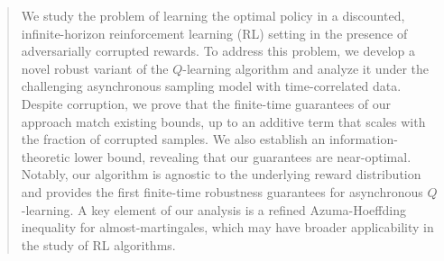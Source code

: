 \documentclass{article}
\begin{document}

\printAffiliationsAndNotice{}  %



\begin{abstract}
We study the problem of learning the optimal policy in a discounted, infinite-horizon reinforcement learning (RL) setting in the presence of adversarially corrupted rewards. To address this problem, we develop a novel robust variant of the \(Q\)-learning algorithm and analyze it under the challenging asynchronous sampling model with time-correlated data. Despite corruption, we prove that the finite-time guarantees of our approach match existing bounds, up to an additive term that scales with the fraction of corrupted samples. We also establish an information-theoretic lower bound, revealing that our guarantees are near-optimal. Notably, our algorithm is agnostic to the underlying reward distribution and provides the first finite-time robustness guarantees for asynchronous \(Q\)-learning. A key element of our analysis is a refined Azuma-Hoeffding inequality for almost-martingales, which may have broader applicability in the study of RL algorithms. 
\end{abstract}
\end{document}
